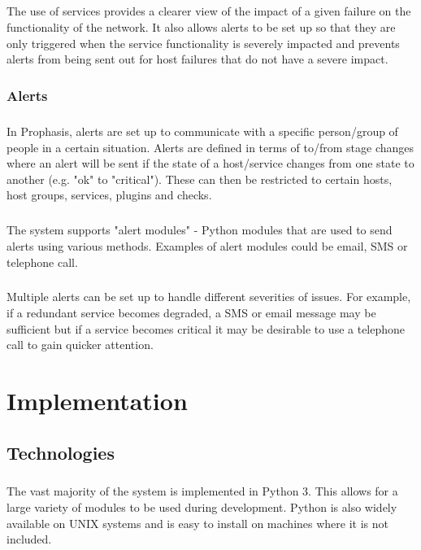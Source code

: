 \documentclass[bsc,logo,twoside]{infthesis}
\begin{document}
\paragraph*{}
	The use of services provides a clearer view of the impact of a given failure
	on the functionality of the network.  It also allows alerts to be set up so
	that they are only triggered when the service functionality is severely
	impacted and prevents alerts from being sent out for host failures that do not
	have a severe impact.

\subsection{Alerts}
\paragraph*{}
	In Prophasis, alerts are set up to communicate with a specific person/group of
	people in a certain situation.  Alerts are defined in terms of to/from stage
	changes where an alert will be sent if the state of a host/service changes
	from one state to another (e.g. "ok" to "critical").  These can then be
	restricted to certain hosts, host groups, services, plugins and checks.
	
\paragraph*{}
	The system supports "alert modules" - Python modules that are used to send
	alerts using various methods.  Examples of alert modules could be email, SMS
	or telephone call.

\paragraph*{}
	Multiple alerts can be set up to handle different severities of issues.  For
	example, if a redundant service becomes degraded, a SMS or email message may
	be sufficient but if a service becomes critical it may be desirable to use
	a telephone call to gain quicker attention.

\chapter{Implementation}
\section{Technologies}
\paragraph*{}
	The vast majority of the system is implemented in Python 3.  This allows for a
	large variety of modules to be used during development. Python is also widely
	available on UNIX systems and is easy to install on machines where it is not
	included.
	
\end{document}
